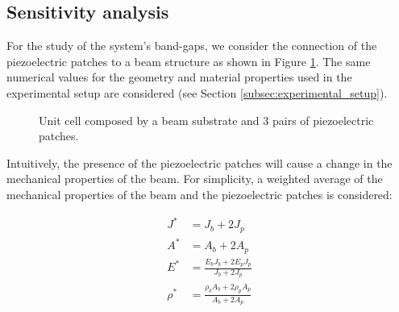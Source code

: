 \subsection{Sensitivity analysis}
\label{subsec:sensitivity_analysis}

For the study of the system's band-gaps, we consider the connection of the piezoelectric patches to a beam structure as shown in Figure \ref{fig:beam_piezo_patches}.
The same numerical values for the geometry and material properties used in the experimental setup are considered (see Section \ref{subsec:experimental_setup}).

\begin{figure}[H]

    \centering


    \caption{Unit cell composed by a beam substrate and 3 pairs of piezoelectric patches.}
    \label{fig:beam_piezo_patches}

\end{figure}

Intuitively, the presence of the piezoelectric patches will cause a change in the mechanical properties of the beam.
For simplicity, a weighted average of the mechanical properties of the beam and the piezoelectric patches is considered:

\begin{equation}
    \begin{aligned}
        J^*    & = J_b + 2 J_p                                   \\
        A^*    & = A_b + 2 A_p                                   \\
        E^*    & = \frac{E_b J_b + 2 E_p J_p}{J_b + 2 J_p}       \\
        \rho^* & = \frac{\rho_b A_b + 2 \rho_p A_p}{A_b + 2 A_p}
    \end{aligned}
    \label{eq:weighted_average_mechanical_properties}
\end{equation}



